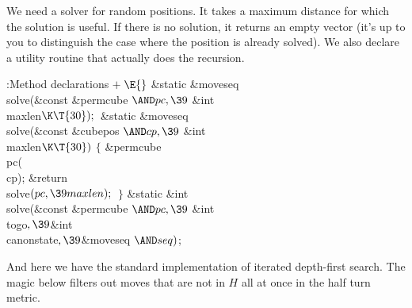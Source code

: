 We need a solver for random positions.  It takes a maximum distance
for which the solution is useful.  If there is no solution, it returns
an empty vector (it's up to you to distinguish the case where the
position is already solved).  We also declare a utility routine
that actually does the recursion.

\Y\B\4:Method declarations\X${}\mathrel+\E{}$\6
\&{static} \&{moveseq} \\{solve}(\&{const} \&{permcube} ${}{\AND}\\{pc},\39{}$%
\&{int} \\{maxlen}${}\K\T{30});{}$\7
\&{static} \&{moveseq} \\{solve}(\&{const} \&{cubepos} ${}{\AND}\\{cp},\39{}$%
\&{int} \\{maxlen}${}\K\T{30}){}$\1\1\2\2\6
${}\{{}$\1\6
\&{permcube} \\{pc}(\\{cp});\7
\&{return} \\{solve}${}(\\{pc},\39\\{maxlen});{}$\6
\4${}\}{}$\2\7
\&{static} \&{int} \\{solve}(\&{const} \&{permcube} ${}{\AND}\\{pc},\39{}$%
\&{int} \\{togo}${},\39{}$\&{int} \\{canonstate}${},\39{}$\&{moveseq} ${}{\AND}%
\\{seq}){}$;\par
\fi

And here we have the standard implementation of iterated depth-first
search.  The magic  below filters out moves that are not in
$H$
all at once in the half turn metric.

